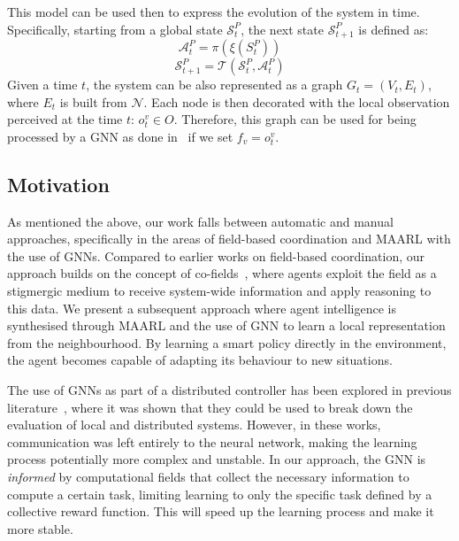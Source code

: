 \documentclass[conference]{IEEEtran}
\begin{document}
This model can be used then to express the evolution of the system in time.
Specifically, starting from a global state $\mathcal{S}^P_t$, the next state $\mathcal{S}^P_{t+1}$ is defined as:
\begin{equation}
\mathcal{A}^P_t = \pi(\xi(S^P_t))
\end{equation}
\begin{equation}
\mathcal{S}^P_{t+1} = \mathcal{T}(\mathcal{S}^P_t, \mathcal{A}^P_t)
\end{equation}
Given a time $t$, the system can be also represented as a graph $G_t = (V_t, E_t)$, 
  where $E_t$ is built from $\mathcal{N}$.
  Each node is then decorated with the local observation perceived at the time $t$: $o^v_t \in O$. 
  Therefore, this graph can be used for being processed by a \ac{GNN} as done in~\cite{DBLP:conf/corl/TolstayaGPP0R19,tolstaya2020learning,DBLP:conf/icra/GosrichMLPYR022} if we set $f_v = o^v_t$.
\subsection{Motivation}
%
As mentioned the above, our work falls between automatic and manual approaches, specifically in the areas of field-based coordination and \ac{MAARL} with the use of \acp{GNN}.
%
Compared to earlier works on field-based coordination, 
 our approach builds on the concept of co-fields~\cite{DBLP:journals/pervasive/MameiZL04}, 
 where agents exploit the field as a stigmergic medium to receive system-wide information and apply reasoning to this data.
%  
We present a subsequent approach where agent intelligence is synthesised through \ac{MAARL} and the use of \ac{GNN} to learn a local representation from the neighbourhood.
%
By learning a smart policy directly in the environment, the agent becomes capable of adapting its behaviour to new situations.

The use of \acp{GNN} as part of a distributed controller has been explored in previous literature~\cite{DBLP:conf/icra/GosrichMLPYR022,DBLP:conf/corl/TolstayaGPP0R19}, 
 where it was shown that they could be used to break down the evaluation of local and distributed systems. 
%
However, in these works, communication was left entirely to the neural network, 
 making the learning process potentially more complex and unstable. 
 In our approach, the \ac{GNN} is \emph{informed} by computational fields that collect the necessary information to compute a certain task, 
 limiting learning to only the specific task defined by a collective reward function.
 This will speed up the learning process and make it more stable.
\end{document}
